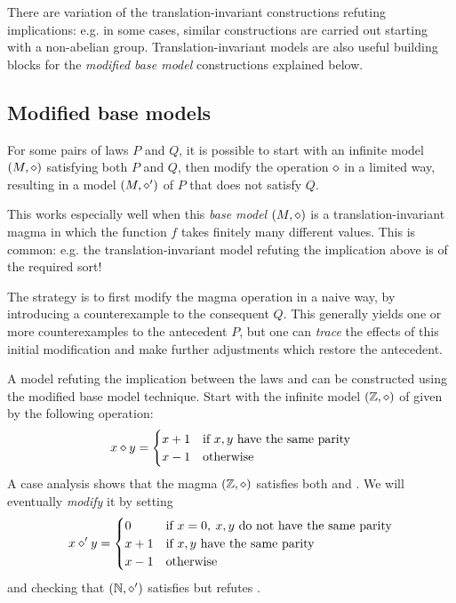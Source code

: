 There are variation of the translation-invariant constructions refuting implications: e.g. in some cases,
similar constructions are carried out starting with a non-abelian group. Translation-invariant models
are also useful building blocks for the \emph{modified base model} constructions explained below.

\subsection{Modified base models}

For some pairs of laws $P$ and $Q$, it is possible to start with an infinite model $(M,\diamond)$ satisfying both $P$ and $Q$,
then modify the operation $\diamond$ in a limited way, resulting in a model $(M,\diamond')$ of $P$ that does not satisfy $Q$.

This works especially well when this \emph{base model} $(M,\diamond)$ is a translation-invariant magma in which
the function $f$ takes finitely many different values. This is common: e.g. the translation-invariant model
refuting the implication above is of the required sort!

The strategy is to first modify the magma operation in a naive way, by introducing a counterexample to the
consequent $Q$. This generally yields one or more counterexamples to the antecedent $P$, but one can
\emph{trace} the effects of this initial modification and make further adjustments which restore the
antecedent.

A model refuting the implication between the laws  and  can be constructed using
the modified base model technique. Start with the infinite model $(\mathbb{Z},\diamond)$ of  given by the following operation:
$$ x\diamond y = \begin{cases} x+1 & \text{if } x,y \text{ have the same parity} \\ x -1 & \text{otherwise} \end{cases} $$
A case analysis shows that the magma $(\mathbb{Z},\diamond)$  satisfies both  and .
We will eventually \emph{modify} it by setting
$$x \diamond' y = \begin{cases} 0 & \text{if } x=0,\: x,y \text{ do not have the same parity} \\  x+1 & \text{if } x,y \text{ have the same parity} \\ x -1 & \text{otherwise} \end{cases}$$
and checking that $(\mathbb{N}, \diamond' )$ satisfies  but refutes .

